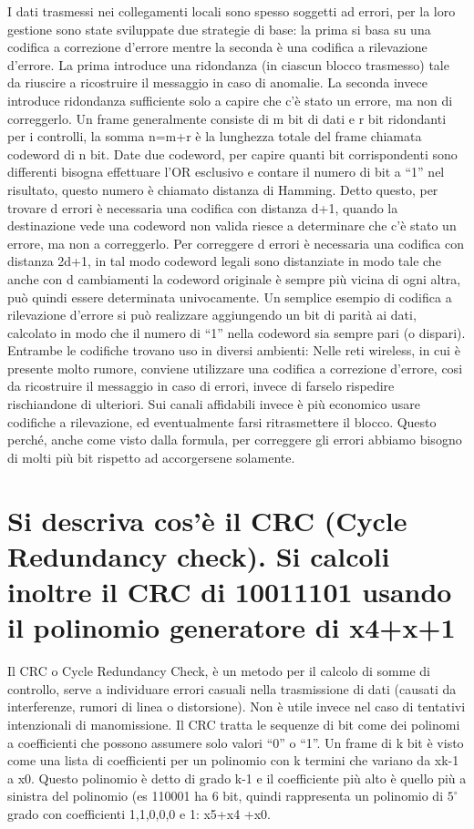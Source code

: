 I dati trasmessi nei collegamenti locali sono spesso soggetti ad errori, per la loro gestione sono state sviluppate due strategie di base: la prima si basa su una codifica a correzione d’errore mentre la seconda è una codifica a rilevazione d’errore.
La prima introduce una ridondanza (in ciascun blocco trasmesso) tale da riuscire a ricostruire il messaggio in caso di anomalie. La seconda invece introduce ridondanza sufficiente solo a capire che c’è stato un errore, ma non di correggerlo.
Un frame generalmente consiste di m bit di dati e r bit ridondanti per i controlli, la somma n=m+r è la lunghezza totale del frame chiamata codeword di n bit. Date due codeword, per capire quanti bit corrispondenti sono differenti bisogna effettuare l’OR esclusivo e contare il numero di bit a “1” nel risultato, questo numero è chiamato distanza di Hamming.
Detto questo, per trovare d errori è necessaria una codifica con distanza d+1, quando la destinazione vede una codeword non valida riesce a determinare che c’è stato un errore, ma non a correggerlo.
Per correggere d errori è necessaria una codifica con distanza 2d+1, in tal modo codeword legali sono distanziate in modo tale che anche con d cambiamenti la codeword originale è sempre più vicina di ogni altra, può quindi essere determinata univocamente.
Un semplice esempio di codifica a rilevazione d’errore si può realizzare aggiungendo un bit di parità ai dati, calcolato in modo che il numero di “1” nella codeword sia sempre pari (o dispari).
Entrambe le codifiche trovano uso in diversi ambienti:
Nelle reti wireless, in cui è presente molto rumore, conviene utilizzare una codifica a correzione d’errore, cosi da ricostruire il messaggio in caso di errori, invece di farselo rispedire rischiandone di ulteriori. 
Sui canali affidabili invece è più economico usare codifiche a rilevazione, ed eventualmente farsi ritrasmettere il blocco.
Questo perché, anche come visto dalla formula, per correggere gli errori abbiamo bisogno di molti più bit rispetto ad accorgersene solamente.

\section{Si descriva cos'è il CRC (Cycle Redundancy check). Si calcoli inoltre il CRC di 10011101 usando il polinomio generatore di x4+x+1}

Il CRC o Cycle Redundancy Check, è un metodo per il calcolo di somme di controllo, serve a individuare errori casuali nella trasmissione di dati (causati da interferenze, rumori di linea o distorsione). Non è utile invece nel caso di tentativi intenzionali di manomissione.
Il CRC tratta le sequenze di bit come dei polinomi a coefficienti che possono assumere solo valori “0” o “1”. Un frame di k bit è visto come una lista di coefficienti per un polinomio con k termini che variano da xk-1 a x0. Questo polinomio è detto di grado k-1 e il coefficiente più alto è quello più a sinistra del polinomio (es 110001 ha 6 bit, quindi rappresenta un polinomio di $5^{\circ}$ grado con coefficienti 1,1,0,0,0 e 1: x5+x4 +x0.

